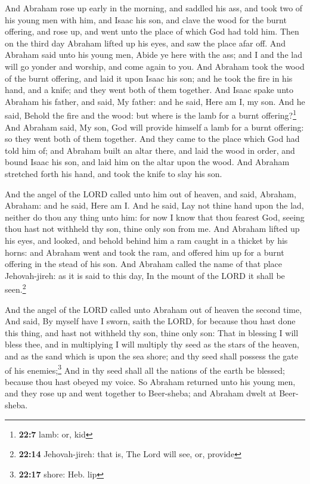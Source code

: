  And Abraham rose up early in the morning, and saddled his
ass, and took two of his young men with him, and Isaac his son, and
clave the wood for the burnt offering, and rose up, and went unto the
place of which God had told him.  Then on the third day
Abraham lifted up his eyes, and saw the place afar off. 
And Abraham said unto his young men, Abide ye here with the ass; and I
and the lad will go yonder and worship, and come again to you.
 And Abraham took the wood of the burnt offering, and laid
it upon Isaac his son; and he took the fire in his hand, and a knife;
and they went both of them together.  And Isaac spake unto
Abraham his father, and said, My father: and he said, Here am I, my son.
And he said, Behold the fire and the wood: but where is the lamb for a
burnt offering?\footnote{\textbf{22:7} lamb: or, kid}  And
Abraham said, My son, God will provide himself a lamb for a burnt
offering: so they went both of them together.  And they
came to the place which God had told him of; and Abraham built an altar
there, and laid the wood in order, and bound Isaac his son, and laid him
on the altar upon the wood.  And Abraham stretched forth
his hand, and took the knife to slay his son.

 And the angel of the LORD called unto him out of heaven,
and said, Abraham, Abraham: and he said, Here am I.  And
he said, Lay not thine hand upon the lad, neither do thou any thing unto
him: for now I know that thou fearest God, seeing thou hast not withheld
thy son, thine only son from me.  And Abraham lifted up
his eyes, and looked, and behold behind him a ram caught in a thicket by
his horns: and Abraham went and took the ram, and offered him up for a
burnt offering in the stead of his son.  And Abraham
called the name of that place Jehovah-jireh: as it is said to this day,
In the mount of the LORD it shall be seen.\footnote{\textbf{22:14}
  Jehovah-jireh: that is, The Lord will see, or, provide}

 And the angel of the LORD called unto Abraham out of
heaven the second time,  And said, By myself have I
sworn, saith the LORD, for because thou hast done this thing, and hast
not withheld thy son, thine only son:  That in blessing I
will bless thee, and in multiplying I will multiply thy seed as the
stars of the heaven, and as the sand which is upon the sea shore; and
thy seed shall possess the gate of his enemies;\footnote{\textbf{22:17}
  shore: Heb. lip}  And in thy seed shall all the nations
of the earth be blessed; because thou hast obeyed my voice.
 So Abraham returned unto his young men, and they rose up
and went together to Beer-sheba; and Abraham dwelt at Beer-sheba.

